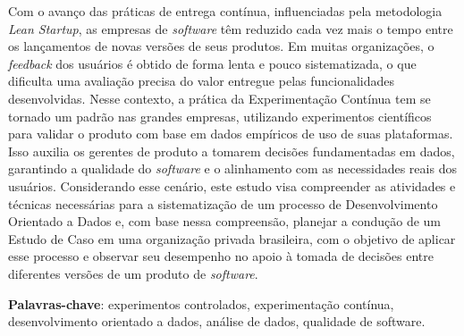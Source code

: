 \begin{resumo}

Com o avanço das práticas de entrega contínua, influenciadas pela metodologia \textit{Lean Startup}, as empresas de \textit{software} têm reduzido cada vez mais o tempo entre os lançamentos de novas versões de seus produtos. Em muitas organizações, o \textit{feedback} dos usuários é obtido de forma lenta e pouco sistematizada, o que dificulta uma avaliação precisa do valor entregue pelas funcionalidades desenvolvidas. Nesse contexto, a prática da Experimentação Contínua tem se tornado um padrão nas grandes empresas, utilizando experimentos científicos para validar o produto com base em dados empíricos de uso de suas plataformas. Isso auxilia os gerentes de produto a tomarem decisões fundamentadas em dados, garantindo a qualidade do \textit{software} e o alinhamento com as necessidades reais dos usuários. Considerando esse cenário, este estudo visa compreender as atividades e técnicas necessárias para a sistematização de um processo de Desenvolvimento Orientado a Dados e, com base nessa compreensão, planejar a condução de um Estudo de Caso em uma organização privada brasileira, com o objetivo de aplicar esse processo e observar seu desempenho no apoio à tomada de decisões entre diferentes versões de um produto de \textit{software}.

\vspace{\onelineskip}

\noindent
\textbf{Palavras-chave}: experimentos controlados, experimentação contínua, desenvolvimento orientado a dados, análise de dados, qualidade de software. 
\end{resumo}
